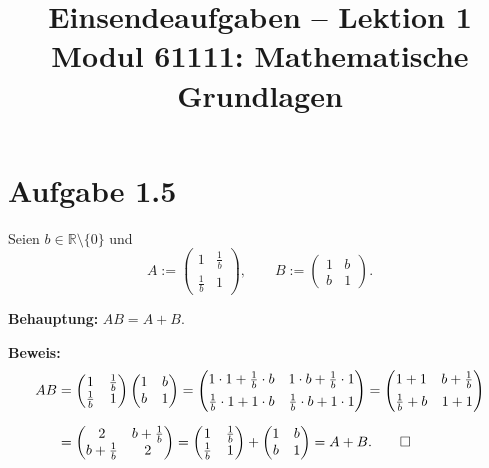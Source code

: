 \documentclass[a4paper,12pt]{article}
\title{Einsendeaufgaben -- Lektion 1\\[0.5em]
\large Modul 61111: Mathematische Grundlagen}
\author{}
\date{}
\begin{document}
\maketitle

\section*{Aufgabe 1.5}

Seien $b \in \mathbb{R} \setminus \{0\}$ und
\[
  A := \begin{pmatrix} 1 & \tfrac{1}{b} \\ \tfrac{1}{b} & 1 \end{pmatrix},
  \qquad
  B := \begin{pmatrix} 1 & b \\ b & 1 \end{pmatrix}.
\]

\textbf{Behauptung:} $AB = A + B$.

\medskip
\textbf{Beweis:}
\begin{align*}
  AB
  &= \begin{pmatrix} 1 & \tfrac{1}{b} \\ \tfrac{1}{b} & 1 \end{pmatrix}
     \begin{pmatrix} 1 & b \\ b & 1 \end{pmatrix}
   = \begin{pmatrix} 1 \cdot 1 + \tfrac{1}{b} \cdot b & 1 \cdot b + \tfrac{1}{b} \cdot 1 \\[4pt]
                     \tfrac{1}{b} \cdot 1 + 1 \cdot b  & \tfrac{1}{b} \cdot b + 1 \cdot 1 \end{pmatrix}
   = \begin{pmatrix} 1+1 & b + \tfrac{1}{b} \\[4pt] \tfrac{1}{b} + b & 1+1 \end{pmatrix} \\[6pt]
  &= \begin{pmatrix} 2 & b + \tfrac{1}{b} \\ b + \tfrac{1}{b} & 2 \end{pmatrix}
   = \begin{pmatrix} 1 & \tfrac{1}{b} \\ \tfrac{1}{b} & 1 \end{pmatrix}
   + \begin{pmatrix} 1 & b \\ b & 1 \end{pmatrix}
   = A + B. \qed
\end{align*}
\end{document}

